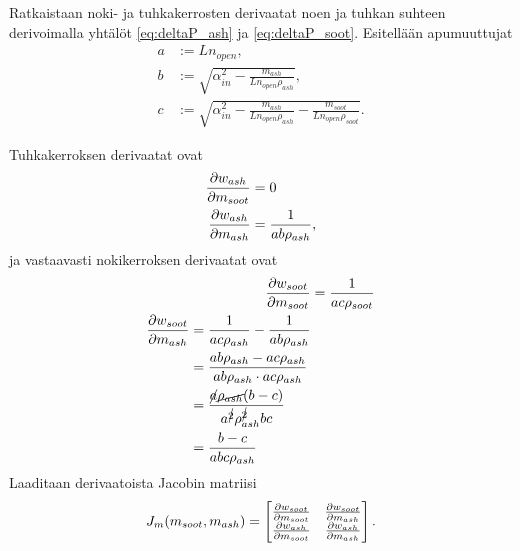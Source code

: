 
Ratkaistaan noki- ja tuhkakerrosten derivaatat noen ja tuhkan suhteen derivoimalla yhtälöt \eqref{eq:deltaP_ash} ja \eqref{eq:deltaP_soot}.
Esitellään apumuuttujat
\begin{align*}
    a &:= L n_{open}, \\
    b &:= \sqrt{\alpha_{in}^2 - \frac{m_{ash}}{L n_{open} \rho_{ash}}}, \\
    c &:= \sqrt{\alpha_{in}^2 - \frac{m_{ash}}{L n_{open} \rho_{ash}} - \frac{m_{soot}}{L n_{open} \rho_{soot}}}.
\end{align*}

Tuhkakerroksen derivaatat ovat
\begin{align}
    \frac{\partial w_{ash}}{\partial m_{soot}} & =0\\
    \frac{\partial w_{ash}}{\partial m_{ash}} &= \frac{1}{ab\rho_{ash}},
\end{align}
ja vastaavasti nokikerroksen derivaatat ovat
\begin{align}
    \frac{\partial w_{soot}}{\partial m_{soot}} &= \frac{1}{ac\rho_{soot}}\\
    \begin{split}
    \frac{\partial w_{soot}}{\partial m_{ash}} &= \frac{1}{ac\rho_{ash}}-\frac{1}{ab\rho_{ash}}
    \\ &= \frac{ab \rho_{ash} - ac\rho_{ash}}{ab\rho_{ash}\cdot ac \rho_{ash}}
    \\ &= \frac{\cancel{a}\cancel{\rho_{ash}}(b-c)}{a^{\cancel{2}} \rho_{ash}^{\cancel{2}} bc}
    \\ &= \frac{b-c}{abc\rho_{ash}}
    \end{split}
\end{align}
Laaditaan derivaatoista Jacobin matriisi
\begin{align}
    J_m(m_{soot}, m_{ash}) = 
    \begin{bmatrix} 
        \frac{\partial w_{soot}}{\partial m_{soot}} & \frac{\partial w_{soot}}{\partial m_{ash}}
    \\  \frac{\partial w_{ash}}{\partial m_{soot}} & \frac{\partial w_{ash}}{\partial m_{ash}}
     \end{bmatrix}.
\end{align}

